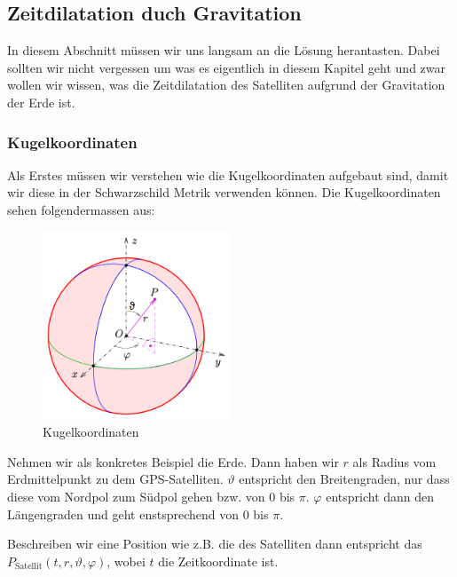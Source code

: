\begin{refsection}
\subsection{Zeitdilatation duch Gravitation}
In diesem Abschnitt müssen wir uns langsam an die Lösung herantasten. Dabei sollten wir nicht vergessen um was es eigentlich in diesem Kapitel geht und zwar wollen wir wissen, was die Zeitdilatation des Satelliten aufgrund der Gravitation der Erde ist.

\subsubsection{Kugelkoordinaten}
Als Erstes müssen wir verstehen wie die Kugelkoordinaten aufgebaut sind, damit wir diese in der Schwarzschild Metrik verwenden können. Die Kugelkoordinaten sehen folgendermassen aus:
\begin{figure}[h]
    \centering
    \includegraphics[width=0.5\textwidth]{gps/pictures/kugelkoordinaten.png}
    \caption{Kugelkoordinaten}
\end{figure}
Nehmen wir als konkretes Beispiel die Erde. Dann haben wir $r$ als Radius vom Erdmittelpunkt zu dem GPS-Satelliten. $\vartheta$ entspricht den Breitengraden, nur dass diese vom Nordpol zum Südpol gehen bzw. von 0 bis $\pi$. $\varphi$ entspricht dann den Längengraden und geht enstsprechend von 0 bis $\pi$. 

Beschreiben wir eine Position wie z.B. die des Satelliten dann entspricht das $P_{\text{Satellit}}(t,r,\vartheta,\varphi)$, wobei $t$ die Zeitkoordinate ist.


\end{refsection}

